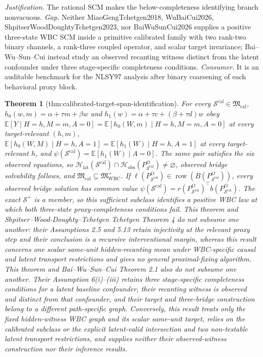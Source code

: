 \documentclass{article}
\newtheorem{theorem}{Theorem}
\begin{document}
\par\smallskip\noindent \textit{Justification.} The rational SCM makes the below-completeness identifying branch nonvacuous. \textit{Gap.} Neither MiaoGengTchetgen2018, WuBaiCui2026, ShpitserWoodDoughtyTchetgen2023, nor BaiWuSunCui2026 supplies a positive three-state WBC SCM inside a primitive calibrated family with two rank-two binary channels, a rank-three coupled operator, and scalar target invariance; Bai--Wu--Sun--Cui instead study an observed recanting witness distinct from the latent confounder under three stage-specific completeness conditions. \textit{Consumer.} It is an auditable benchmark for the NLSY97 analysis after binary coarsening of each behavioral proxy block.

\begin{theorem}[thm:calibrated-target-span-identification]\label{thm:calibrated-target-span-identification}
For every \(\mathcal S^{\mathrm{cal}}\in\mathfrak M_{\mathrm{cal}}\), \(h_0(w,m)=\alpha+\tau m+\beta w\) and \(h_1(w)=\alpha+\tau c+(\beta+\tau d)w\) obey \(\mathbb E[Y\mid H=h,M=m,A=0]=\mathbb E[h_0(W,m)\mid H=h,M=m,A=0]\) at every target-relevant \((h,m)\), \(\mathbb E[h_0(W,M)\mid H=h,A=1]=\mathbb E[h_1(W)\mid H=h,A=1]\) at every target-relevant \(h\), and \(\psi(\mathcal S^{\mathrm{cal}})=\mathbb E[h_1(W)\mid A=0]\). The same pair satisfies the six observed equations, so \(\mathcal H_{\mathrm{lat}}(\mathcal S^{\mathrm{cal}})\cap\mathcal H_{\mathrm{obs}}(P_{\mathcal S^{\mathrm{cal}}}^O)\neq\varnothing\), observed bridge solvability follows, and \(\mathfrak M_{\mathrm{cal}}\subseteq\mathfrak M_{\mathrm{WBC}}^{+}\). If \(\ell(P_{\mathcal S^{\mathrm{cal}}}^O)\in\operatorname{row}(B(P_{\mathcal S^{\mathrm{cal}}}^O))\), every observed bridge solution has common value \(\psi(\mathcal S^{\mathrm{cal}})=r(P_{\mathcal S^{\mathrm{cal}}}^O)^{\top}b(P_{\mathcal S^{\mathrm{cal}}}^O)\). The exact \(\mathcal S^+\) is a member, so this sufficient subclass identifies a positive WBC law at which both three-state proxy-completeness conditions fail. This theorem and Shpitser--Wood-Doughty--Tchetgen Tchetgen Theorem 4 do not subsume one another: their Assumptions 2.5 and 5.13 retain injectivity at the relevant proxy step and their conclusion is a recursive interventional margin, whereas this result concerns one scalar same-unit hidden-recanting mean under WBC-specific causal and latent transport restrictions and gives no general proximal-fixing algorithm. This theorem and Bai--Wu--Sun--Cui Theorem 2.1 also do not subsume one another. Their Assumption 6(i)--(iii) retains three stage-specific completeness conditions for a latent baseline confounder, their recanting witness is observed and distinct from that confounder, and their target and three-bridge construction belong to a different path-specific graph. Conversely, this result treats only the fixed hidden-witness WBC graph and its scalar same-unit target, relies on the calibrated subclass or the explicit latent-valid intersection and two non-testable latent transport restrictions, and supplies neither their observed-witness construction nor their inference results.
\end{theorem}
\end{document}
